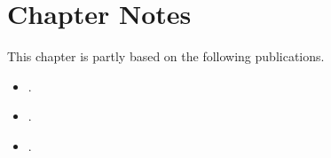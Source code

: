 \section*{Chapter Notes}
This chapter is partly based on the following publications.

\begin{itemize}
  \item {}.
  \item {}.
  \item {}.
\end{itemize}


\clearpage

